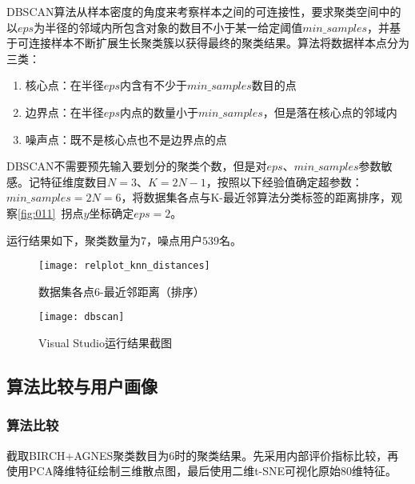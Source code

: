 \documentclass[withoutpreface,bwprint]{cumcmthesis}
\begin{document}
DBSCAN算法从样本密度的角度来考察样本之间的可连接性，要求聚类空间中的以$eps$为半径的邻域内所包含对象的数目不小于某一给定阈值$min\_samples$，并基于可连接样本不断扩展生长聚类簇以获得最终的聚类结果\cite{机器学习}。算法将数据样本点分为三类：

\begin{enumerate}
    \item 核心点：在半径$eps$内含有不少于$min\_samples$数目的点
    \item 边界点：在半径$eps$内点的数量小于$min\_samples$，但是落在核心点的邻域内
    \item 噪声点：既不是核心点也不是边界点的点
\end{enumerate}

DBSCAN不需要预先输入要划分的聚类个数，但是对$eps$、$min\_samples$参数敏感。记特征维度数目$N=3$、$K=2N-1$，按照以下经验值确定超参数\cite{eps1,eps2}：$min\_samples=2N=6$，将数据集各点与K-最近邻算法分类标签的距离排序，观察\cref{fig:011}~拐点$y$坐标确定$eps=2$。

运行结果如下，聚类数量为$7$，噪点用户$539$名。

\begin{figure}[!htbp]
    \centering
    \begin{minipage}[c]{0.49\textwidth}
        \centering
        \texttt{[image: relplot\_knn\_distances]}
        \caption{数据集各点6-最近邻距离（排序）}
        \label{fig:011}
    \end{minipage}
    \begin{minipage}[c]{0.49\textwidth}
        \centering
        \texttt{[image: dbscan]}
        \caption{Visual Studio运行结果截图}
        \label{fig:012}
    \end{minipage}
\end{figure}

\subsection{算法比较与用户画像}

\subsubsection{算法比较}

截取BIRCH+AGNES聚类数目为$6$时的聚类结果。先采用内部评价指标比较，再使用PCA降维特征绘制三维散点图，最后使用二维t-SNE\cite{tsne}可视化原始80维特征。
\end{document}
